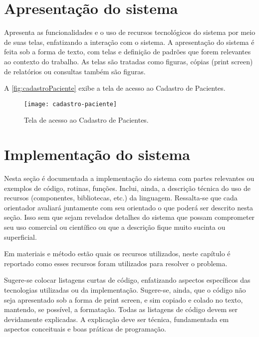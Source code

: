 \section{Apresentação do sistema}\label{sec:apresentacaoSistema}

Apresenta as funcionalidades e o uso de recursos tecnológicos do sistema por meio de suas telas, enfatizando a interação com o sistema. A apresentação do sistema é feita sob a forma de texto, com telas e definição de padrões que forem relevantes ao contexto do trabalho. As telas são tratadas como figuras, cópias (print screen) de relatórios ou consultas também são figuras.

A \autoref{fig:cadastroPaciente} exibe a tela de acesso ao Cadastro de Pacientes.

\begin{figure}[htpb]%
  \captionsetup{width=0.43\textwidth}
  \caption{Tela de acesso ao Cadastro de Pacientes.}%
  \label{fig:cadastroPaciente}%
  \texttt{[image: cadastro-paciente]}%
  \fonte{}%
\end{figure}

\section{Implementação do sistema}\label{sec:implementacaoSistema}

Nesta seção é documentada a implementação do sistema com partes relevantes ou exemplos de código, rotinas, funções. Inclui, ainda, a descrição técnica do uso de recursos (componentes, bibliotecas, etc.) da linguagem. Ressalta-se que cada orientador avaliará juntamente com seu orientado o que poderá ser descrito nesta seção. Isso sem que sejam revelados detalhes do sistema que possam comprometer seu uso comercial ou científico ou que a descrição fique muito sucinta ou superficial.

Em materiais e método estão quais os recursos utilizados, neste capítulo é reportado como esses recursos foram utilizados para resolver o problema.

Sugere-se colocar listagens curtas de código, enfatizando aspectos específicos das tecnologias utilizadas ou da implementação. Sugere-se, ainda, que o código não seja apresentado sob a forma de print screen, e sim copiado e colado no texto, mantendo, se possível, a formatação. Todas as listagens de código devem ser devidamente explicadas. A explicação deve ser técnica, fundamentada em aspectos conceituais e boas práticas de programação.

